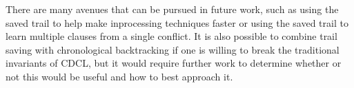 \documentclass[runningheads]{llncs}
\begin{document}
There are many avenues that can be pursued in future work, such as
using the saved trail to help make inprocessing techniques faster or
using the saved trail to learn multiple clauses from a single
conflict. It is also possible to combine trail saving with
chronological backtracking if one is willing to break the traditional
invariants of CDCL, but it would require further work to determine
whether or not this would be useful and how to best approach it.

{}

\end{document}
